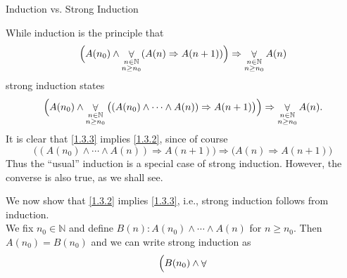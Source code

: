 \documentclass[smaller,hyperref={CJKbookmarks=true}]{beamer}
\newcommand{\N}{\mathbb{N}} \newcommand{\Z}{\mathbb{Z}} \newcommand{\Q}{\mathbb{Q}}
\begin{document}
\begin{frame}{Induction vs. Strong Induction}
\begin{spacing}{1.05}
While induction is the principle that
\begin{equation}\label{1.3.2}
\Big(A(n_0)\wedge\mathop{\forall}_{\begin{subarray}{c}
                                     n\in\N\\
                                     n\geq n_0
                                   \end{subarray}}(A(n)\Rightarrow A(n+1))\Big)\Rightarrow\mathop{\forall}_{\begin{subarray}{c}
                                     n\in\N\\
                                     n\geq n_0
                                   \end{subarray}}A(n)
\end{equation}
strong induction states
\begin{equation}\label{1.3.3}
\Big(A(n_0)\wedge\mathop{\forall}_{\begin{subarray}{c}
                                     n\in\N\\
                                     n\geq n_0
                                   \end{subarray}}\big((A(n_0)\wedge\cdots\wedge A(n))\Rightarrow A(n+1)\big)\Big)\Rightarrow\mathop{\forall}_{\begin{subarray}{c}
                                     n\in\N\\
                                     n\geq n_0
                                   \end{subarray}}A(n).
\end{equation}
It is clear that \eqref{1.3.3} implies \eqref{1.3.2}, since of course
\[\big((A(n_0)\wedge\cdots\wedge A(n))\Rightarrow A(n+1)\big)\Rightarrow\big(A(n)\Rightarrow A(n+1)\big)\]
Thus the ``usual'' induction is a special case of strong induction. However,
the converse is also true, as we shall see.
\end{spacing}
\newpage
\begin{spacing}{0.9}
We now show that \eqref{1.3.2} implies \eqref{1.3.3}, i.e., strong induction follows from induction.\\[4pt]
We fix $n_0\in\N$ and define $B(n):A(n_0)\wedge\cdots\wedge A(n)$ for $n\geq n_0$. Then $A(n_0)=B(n_0)$ and we can write strong induction as
\[\Big(B(n_0)\wedge\mathop{\forall}_{\begin{subarray}{c}

\end{subarray}}\]
\end{spacing}
\end{frame}
\end{document}
